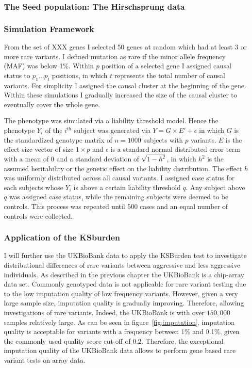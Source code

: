 \subsubsection{The Seed population: The Hirschsprung data}
\label{ssub:The_Seed_population:_The_Hirschsprung_data}

\subsubsection{Simulation Framework}
\label{ssub:Simulation_Framework}

From the set of XXX genes I selected 50 genes at random which had at least 3 or more rare variants. 
I defined mutation as rare if the minor allele frequency (MAF) was below 1\%. 
Within $p$ position of a selected gene I assigned causal status to $p_1 \ldots p_t$ positions, in which $t$ represents the total number of causal variants.
For simplicity I assigned the causal cluster at the beginning of the gene.
Within these simulations I gradually increased the size of the causal cluster to eventually cover the whole gene. 

The phenotype was simulated via a liability threshold model.
Hence the phenotype $Y_i$ of the $i^{th}$ subject was generated via
$Y = G\times E' + \epsilon$
in which $G$ is the standardized genotype matrix of $n=1000$ subjects with $p$ variants.
$E$ is the effect size vector of size $1\times p$ and $\epsilon$ is a standard normal distributed error term with a mean of $0$ and a standard deviation of $\sqrt{1-h^2}$, in which $h^2$ is the assumed heritability or the genetic effect on the liability distribution.
The effect $h$ was uniformly distributed across all causal variants.
I assigned case status for each subjects whose $Y_i$ is above a certain liability threshold $q$.
Any subject above $q$ was assigned case status, while the remaining subjects were deemed to be controls.
This process was repeated until $500$ cases and an equal number of controls were collected.

\subsubsection{Application of the KSburden}
\label{ssub:Application_of_the_KSburden}

I will further use the UKBioBank data to apply the KSBurden test to investigate distributional differences of rare variants between aggressive and less aggressive individuals.
As described in the previous chapter the UKBioBank is a chip-array data set.
Commonly genotyped data is not applicable for rare variant testing due to the low imputation quality of low frequency variants.
However, given a very large sample size, imputation quality is gradually improving.
Therefore, allowing investigations of rare variants.
Indeed, the UKBioBank is with over $150,000$ samples relatively large.
As can be seen in figure~\ref{fig:imputation}, imputation quality is acceptable for variants with a frequency between 1\% and 0.1\%, given the commonly used quality score cut-off of $0.2$.
Therefore, the exceptional imputation quality of the UKBioBank data allows to perform gene based rare variant tests on array data.

